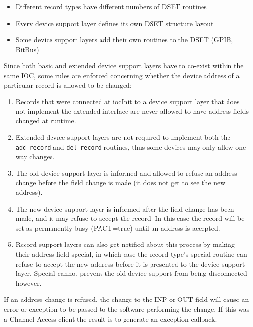 \begin{itemize}
\item Different record types have different numbers of DSET routines

\item Every device support layer defines its own DSET structure layout

\item Some device support layers add their own routines to the DSET (GPIB, BitBus)

\end{itemize}

Since both basic and extended device support layers have to co-exist within the same IOC, some rules are enforced concerning whether the device address of a particular record is allowed to be changed:

\begin{enumerate}
\item Records that were connected at iocInit to a device support layer that does not implement the extended interface are never allowed to have address fields changed at runtime.

\item Extended device support layers are not required to implement both the \verb|add_record| and \verb|del_record| routines, thus some devices may only allow one-way changes.

\item The old device support layer is informed and allowed to refuse an address change before the field change is made (it does not get to see the new address).

\item The new device support layer is informed after the field change has been made, and it may refuse to accept the record.
In this case the record will be set as permanently busy (PACT=true) until an address is accepted.

\item Record support layers can also get notified about this process by making their address field special, in which case the record type's special routine can refuse to accept the new address before it is presented to the device support layer.
Special cannot prevent the old device support from being disconnected however.

\end{enumerate}

If an address change is refused, the change to the INP or OUT field will cause an error or exception to be passed to the software performing the change.
If this was a Channel Access client the result is to generate an exception callback.

